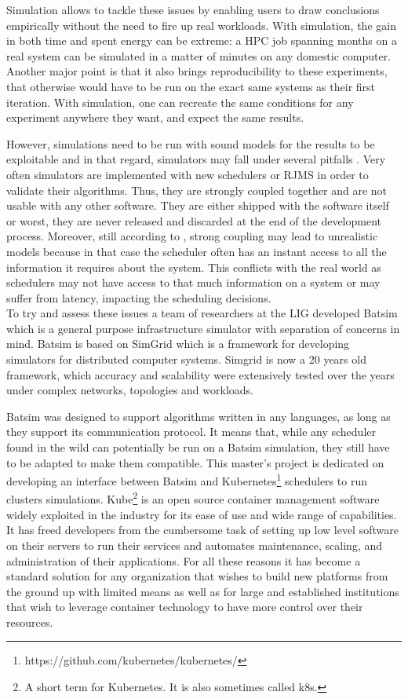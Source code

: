 Simulation allows to tackle these issues by enabling users to draw conclusions
empirically without the need to fire up real workloads. With simulation, the
gain in both time and spent energy can be extreme: a HPC job spanning months on
a real system can be simulated in a matter of minutes on any domestic computer.
Another major point is that it also brings reproducibility to these
experiments, that otherwise would have to be run on the exact same systems as
their first iteration. With simulation, one can recreate the same conditions
for any experiment anywhere they want, and expect the same results.

However, simulations need to be run with sound models for the results to be
exploitable and in that regard, simulators may fall under several pitfalls
\cite{poquet:tel-01757245}. Very often simulators are implemented with new
schedulers or RJMS in order to validate their algorithms. Thus, they are
strongly coupled together and are not usable with any other software. They are
either shipped with the software itself or worst, they are never released and
discarded at the end of the development process.  Moreover, still according to
\cite{poquet:tel-01757245}, strong coupling may lead to unrealistic models
because in that case the scheduler often has an instant access to all the
information it requires about the system. This conflicts with the real world as
schedulers may not have access to that much information on a system or may
suffer from latency, impacting the scheduling decisions.\\


To try and assess these issues a team of researchers at the LIG developed
Batsim\cite{dutot:hal-01333471} which is a general purpose infrastructure
simulator with separation of concerns in mind. Batsim is based on
SimGrid\cite{casanova:hal-01017319} which is a framework for developing
simulators for distributed computer systems. Simgrid is now a 20 years old
framework, which accuracy and scalability were extensively tested over the
years under complex networks, topologies and workloads. 

Batsim was designed to support algorithms written in any languages, as long as
they support its communication protocol. It means that, while any scheduler
found in the wild can potentially be run on a Batsim simulation, they still
have to be adapted to make them compatible. This master's project is dedicated
on developing an interface between Batsim and
Kubernetes\footnote{https://github.com/kubernetes/kubernetes/} schedulers to
run clusters simulations. Kube\footnote{A short term for Kubernetes. It is also
sometimes called k8s.} is an open source container management software widely
exploited in the industry for its ease of use and wide range of capabilities.
It has freed developers from the cumbersome task of setting up low level
software on their servers to run their services and automates maintenance,
scaling, and administration of their applications.  For all these reasons it
has become a standard solution for any organization that wishes to build new
platforms from the ground up with limited means as well as for large and
established institutions that wish to leverage container technology to have
more control over their resources.\\

